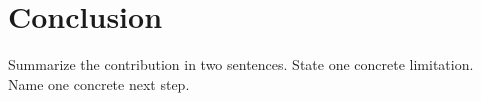 \section{Conclusion}\label{sec:conclusion}

Summarize the contribution in two sentences.
State one concrete limitation.
Name one concrete next step.
